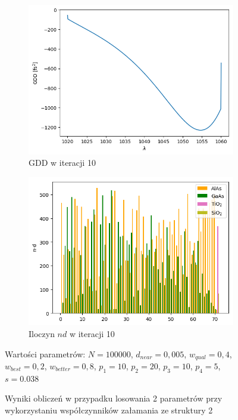 \begin{figure} [H]
\begin{subfigure}[b]{0.31\textwidth}
        \includegraphics[width=\linewidth]{figures/wyniki/2stopien/morebees/result_gddresult10.png}
        \caption{GDD w iteracji 10}
    \end{subfigure}
        \begin{subfigure}[b]{0.32\textwidth}
        \includegraphics[width=\linewidth]{figures/wyniki/2stopien/morebees/result_ndresult10.png}
        \caption{Iloczyn $nd$ w iteracji 10}
    \end{subfigure}
    \caption{Wyniki obliczeń w przypadku losowania 2 parametrów przy wykorzystaniu współczynników załamania ze struktury 2}
    Wartości parametrów: $N= 100000$, $d_{near}= 0,005$, $w_{qual}=0,4$, $w_{best}=0,2$, $w_{better}=0,8$, $p_1=10$, $p_2=20$, $p_3=10$, $p_4=5$, $s=0.038$
    \label{fig:wyn2stp3}
\end{figure}